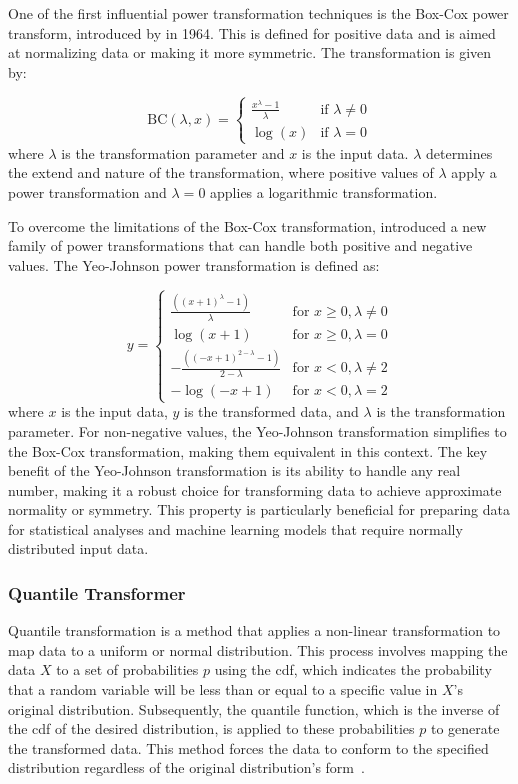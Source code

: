 One of the first influential power transformation techniques is the Box-Cox power transform, introduced by \citet{BoxAndCox} in 1964.
This is defined for positive data and is aimed at normalizing data or making it more symmetric. The transformation is given by:

$$
\text{BC}(\lambda, x) =
\begin{cases}
\frac{x^\lambda - 1}{\lambda} & \text{if } \lambda \neq 0 \\
\log(x) & \text{if } \lambda = 0
\end{cases}
$$
where $ \lambda $ is the transformation parameter and $x$ is the input data.
$\lambda$ determines the extend and nature of the transformation, where positive values of $\lambda$ apply a power transformation and $\lambda = 0$ applies a logarithmic transformation.

To overcome the limitations of the Box-Cox transformation, \citet{YeoJohnson} introduced a new family of power transformations that can handle both positive and negative values.
The Yeo-Johnson power transformation is defined as:

$$
y =
\begin{cases}
\frac{((x + 1)^\lambda - 1)}{\lambda} & \text{for } x \geq 0, \lambda \neq 0 \\
\log(x + 1) & \text{for } x \geq 0, \lambda = 0 \\
-\frac{((-x + 1)^{2 - \lambda} - 1)}{2 - \lambda} & \text{for } x < 0, \lambda \neq 2 \\
-\log(-x + 1) & \text{for } x < 0, \lambda = 2
\end{cases}
$$
where $x$ is the input data, $y$ is the transformed data, and $\lambda$ is the transformation parameter.
For non-negative values, the Yeo-Johnson transformation simplifies to the Box-Cox transformation, making them equivalent in this context.
The key benefit of the Yeo-Johnson transformation is its ability to handle any real number, making it a robust choice for transforming data to achieve approximate normality or symmetry.
This property is particularly beneficial for preparing data for statistical analyses and machine learning models that require normally distributed input data.

\subsubsection{Quantile Transformer}
Quantile transformation is a method that applies a non-linear transformation to map data to a uniform or normal distribution.
This process involves mapping the data $X$ to a set of probabilities $p$ using the \gls{cdf}, which indicates the probability that a random variable will be less than or equal to a specific value in $X$'s original distribution.
Subsequently, the quantile function, which is the inverse of the \gls{cdf} of the desired distribution, is applied to these probabilities $p$ to generate the transformed data.
This method forces the data to conform to the specified distribution regardless of the original distribution's form~\cite{Vasques2024}.

